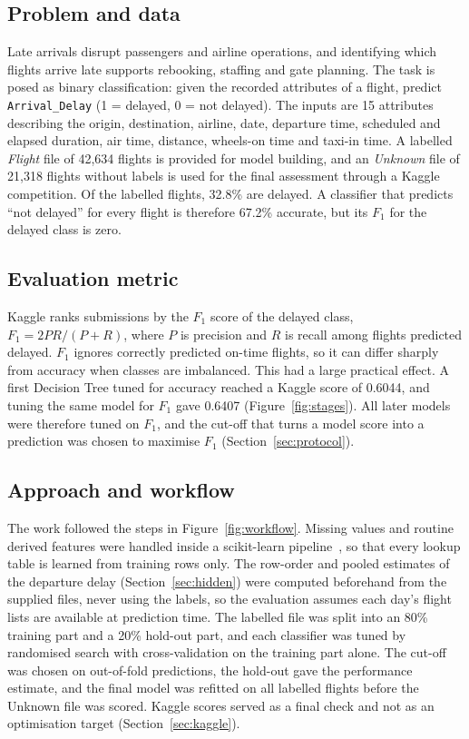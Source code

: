 \documentclass[12pt,a4paper]{article}
\newcommand{\Fone}{$F_1$}
\newcommand{\code}[1]{\texttt{\small #1}}
\begin{document}
\subsection{Problem and data}
Late arrivals disrupt passengers and airline operations, and identifying which flights arrive late supports rebooking, staffing and gate planning. The task is posed as binary classification: given the recorded attributes of a flight, predict \code{Arrival\_Delay} (1 = delayed, 0 = not delayed). The inputs are 15 attributes describing the origin, destination, airline, date, departure time, scheduled and elapsed duration, air time, distance, wheels-on time and taxi-in time. A labelled \emph{Flight} file of 42,634 flights is provided for model building, and an \emph{Unknown} file of 21,318 flights without labels is used for the final assessment through a Kaggle competition. Of the labelled flights, 32.8\% are delayed. A classifier that predicts ``not delayed'' for every flight is therefore 67.2\% accurate, but its \Fone{} for the delayed class is zero.

\subsection{Evaluation metric}
Kaggle ranks submissions by the \Fone{} score of the delayed class, $F_1 = 2PR/(P+R)$, where $P$ is precision and $R$ is recall among flights predicted delayed. \Fone{} ignores correctly predicted on-time flights, so it can differ sharply from accuracy when classes are imbalanced. This had a large practical effect. A first Decision Tree tuned for accuracy reached a Kaggle score of 0.6044, and tuning the same model for \Fone{} gave 0.6407 (Figure~\ref{fig:stages}). All later models were therefore tuned on \Fone{}, and the cut-off that turns a model score into a prediction was chosen to maximise \Fone{} (Section~\ref{sec:protocol}).

\subsection{Approach and workflow}
The work followed the steps in Figure~\ref{fig:workflow}. Missing values and routine derived features were handled inside a scikit-learn pipeline~\cite{sklearn}, so that every lookup table is learned from training rows only. The row-order and pooled estimates of the departure delay (Section~\ref{sec:hidden}) were computed beforehand from the supplied files, never using the labels, so the evaluation assumes each day's flight lists are available at prediction time. The labelled file was split into an 80\% training part and a 20\% hold-out part, and each classifier was tuned by randomised search with cross-validation on the training part alone. The cut-off was chosen on out-of-fold predictions, the hold-out gave the performance estimate, and the final model was refitted on all labelled flights before the Unknown file was scored. Kaggle scores served as a final check and not as an optimisation target (Section~\ref{sec:kaggle}).
\end{document}
